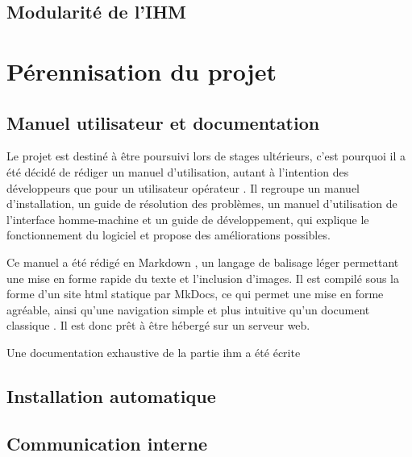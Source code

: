 		\subsection{Modularité de l'IHM}
		
			\lipsum[2]
			
	\section{Pérennisation du projet}
	
		\subsection{Manuel utilisateur et documentation}
		\label{sub:manuel}

			Le projet est destiné à être poursuivi lors de stages ultérieurs, c'est pourquoi il a été décidé de rédiger un manuel d'utilisation, autant à l'intention des développeurs que pour un utilisateur \og opérateur \fg{}. Il regroupe un manuel d'installation, un guide de résolution des problèmes, un manuel d'utilisation de l'interface homme-machine et un guide de développement, qui explique le fonctionnement du logiciel et propose des améliorations possibles.
			\par
			Ce manuel a été rédigé en Markdown \cite{markdown}, un langage de balisage léger permettant une mise en forme rapide du texte et l'inclusion d'images. Il est compilé sous la forme d'un site html statique par MkDocs\cite{mkdocs}, ce qui permet une mise en forme agréable, ainsi qu'une navigation simple et plus intuitive qu'un document \og classique \fg{}. Il est donc prêt à être hébergé sur un serveur web.
			\par
			Une documentation exhaustive de la partie \gls{ihm} a été écrite
			
		\subsection{Installation automatique}
		
				
		\subsection{Communication interne}
		

